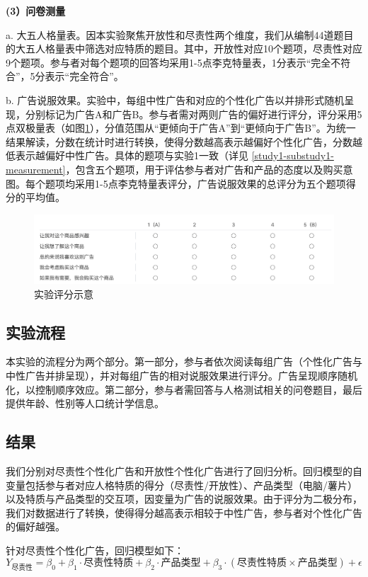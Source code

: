 \textbf{(3）问卷测量}

a. 大五人格量表。因本实验聚焦开放性和尽责性两个维度，我们从\citet{john1991big}编制44道题目的大五人格量表中筛选对应特质的题目。其中，开放性对应10个题项，尽责性对应9个题项。参与者对每个题项的回答均采用1-5点李克特量表，1分表示“完全不符合”，5分表示“完全符合”。

b. 广告说服效果。实验中，每组中性广告和对应的个性化广告以并排形式随机呈现，分别标记为广告A和广告B。参与者需对两则广告的偏好进行评分，评分采用5点双极量表（如图\ref{fig:study1-exp2-rating-example}），分值范围从“更倾向于广告A”到“更倾向于广告B”。为统一结果解读，分数在统计时进行转换，使得分数越高表示越偏好个性化广告，分数越低表示越偏好中性广告。具体的题项与实验1一致（详见 \ref{study1-substudy1-measurement}，包含五个题项，用于评估参与者对广告和产品的态度以及购买意图。每个题项均采用1-5点李克特量表评分，广告说服效果的总评分为五个题项得分的平均值。

\begin{figure}[H]
    \centering
    \includegraphics[width=.7\linewidth]{Image/Study1-exp2-rating.png}
    \caption{\label{fig:study1-exp2-rating-example}实验评分示意}
\end{figure}



\subsection{实验流程}
本实验的流程分为两个部分。第一部分，参与者依次阅读每组广告（个性化广告与中性广告并排呈现），并对每组广告的相对说服效果进行评分。广告呈现顺序随机化，以控制顺序效应。第二部分，参与者需回答与人格测试相关的问卷题目，最后提供年龄、性别等人口统计学信息。

\subsection{结果}
我们分别对尽责性个性化广告和开放性个性化广告进行了回归分析。回归模型的自变量包括参与者对应人格特质的得分（尽责性/开放性）、产品类型（电脑/薯片）以及特质与产品类型的交互项，因变量为广告的说服效果。由于评分为二极分布，我们对数据进行了转换，使得得分越高表示相较于中性广告，参与者对个性化广告的偏好越强。

针对尽责性个性化广告，回归模型如下： \begin{equation} Y_{\text{尽责性}} = \beta_0 + \beta_1 \cdot \text{尽责性特质} + \beta_2 \cdot \text{产品类型} + \beta_3 \cdot (\text{尽责性特质} \times \text{产品类型}) + \epsilon \end{equation}

